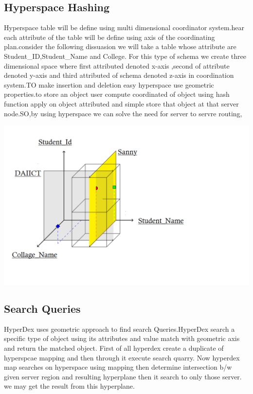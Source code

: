 \documentclass[13pt]{article}
\begin{document}
\subsection{ Hyperspace Hashing }
Hyperspace table will be define using multi dimensional coordinator system.hear each attribute of the table will be define using axis of the coordinating plan.consider the following dissuasion we will take a table whose attribute are Student\_ID,Student\_Name and College. For this type of schema we create three dimensional space where first attributed denoted x-axis ,second of attribute denoted y-axis and third attributed of schema denoted z-axis in coordination system.TO make insertion and deletion easy hyperspace use geometric properties.to store an object user compute coordinated of object using hash function apply on object attributed and simple store that object at that server node.SO,by using hyperspace we can solve the need for server to servre routing,  

\begin{left}
\includegraphics[width=0.95\linewidth]{
p1.png}\par 
\end{left}

\subsection{ Search Queries}

HyperDex uses geometric approach to find search Queries.HyperDex search a specific type of object using its attributes and value match with geometric axis and return the matched object. First of all hyperdex create a duplicate of  hyperspcae mapping and then through it execute search quarry. Now hyperdex map searches on hyperspace using mapping then determine intersection b/w given server region and resulting hyperplane then it search to only those server. we may get the result from this hyperplane.
\end{document}
